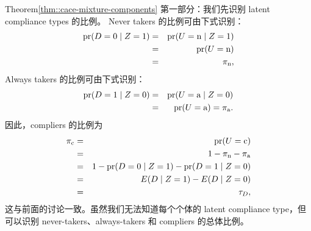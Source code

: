  
\begin{myproof}{Theorem}{\cref{thm::cace-mixture-components}}
第一部分：我们先识别 latent compliance types 的比例。
Never takers 的比例可由下式识别：
\begin{eqnarray*}
\textup{pr}(D=0\mid Z=1) 
&=& \textup{pr}(U=\textup{n} \mid Z=1)  \\
&=& \textup{pr}(U=\textup{n}) \\
&=&  \pi_{\textup{n}} ,
\end{eqnarray*}
Always takers 的比例可由下式识别：
\begin{eqnarray*}
\textup{pr}(D=1\mid Z=0) 
&=& \textup{pr}(U=\textup{a} \mid Z=0)  \\
&=& \textup{pr}(U=\textup{a}) =  \pi_{\textup{a}} . 
\end{eqnarray*}
因此，compliers 的比例为
\begin{eqnarray*}
\pi_{\textup{c}} &=& \textup{pr}(U=\textup{c}) \\
&=& 1-  \pi_{\textup{n}} -  \pi_{\textup{a}}  \\
&=& 1 - \textup{pr}(D=0\mid Z=1)  - \textup{pr}(D=1\mid Z=0) \\
&=& E(D\mid Z=1) - E(D\mid Z=0) \\
&=& \tau_D,
\end{eqnarray*}
这与前面的讨论一致。虽然我们无法知道每个个体的 latent compliance type，但可以识别 never-takers、always-takers 和 compliers 的总体比例。



\end{myproof}
